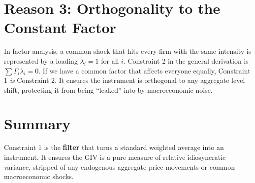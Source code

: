 \documentclass[12pt]{article}
\begin{document}
\section{Reason 3: Orthogonality to the Constant Factor}
In factor analysis, a common shock that hits every firm with the same intensity is represented by a loading $\lambda_i = 1$ for all $i$.
Constraint 2 in the general derivation is $\sum \Gamma_i \lambda_i = 0$.
If we have a common factor that affects everyone equally, Constraint 1 \textit{is} Constraint 2. It ensures the instrument is orthogonal to any aggregate level shift, protecting it from being ``leaked'' into by macroeconomic noise.

\section{Summary}
Constraint 1 is the \textbf{filter} that turns a standard weighted average into an instrument. It ensures the GIV is a pure measure of relative idiosyncratic variance, stripped of any endogenous aggregate price movements or common macroeconomic shocks.
\end{document}
